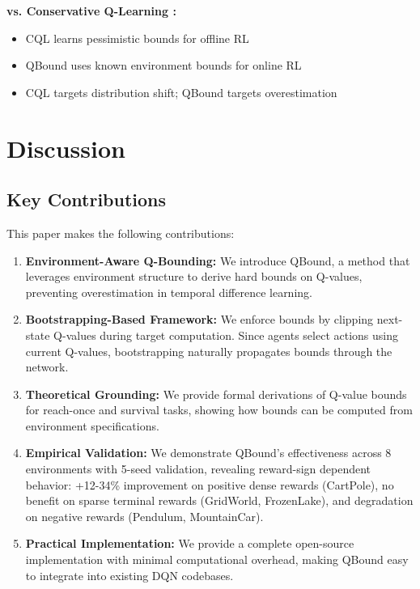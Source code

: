 \documentclass[11pt]{article}
\theoremstyle{definition}
\theoremstyle{remark}
\begin{document}
\textbf{vs. Conservative Q-Learning \citep{kumar2020conservative}:}
\begin{itemize}
    \item CQL learns pessimistic bounds for offline RL
    \item QBound uses known environment bounds for online RL
    \item CQL targets distribution shift; QBound targets overestimation
\end{itemize}

\section{Discussion}

\subsection{Key Contributions}

This paper makes the following contributions:

\begin{enumerate}
    \item \textbf{Environment-Aware Q-Bounding:} We introduce QBound, a method that leverages environment structure to derive hard bounds on Q-values, preventing overestimation in temporal difference learning.

    \item \textbf{Bootstrapping-Based Framework:} We enforce bounds by clipping next-state Q-values during target computation. Since agents select actions using current Q-values, bootstrapping naturally propagates bounds through the network.

    \item \textbf{Theoretical Grounding:} We provide formal derivations of Q-value bounds for reach-once and survival tasks, showing how bounds can be computed from environment specifications.

    \item \textbf{Empirical Validation:} We demonstrate QBound's effectiveness across 8 environments with 5-seed validation, revealing reward-sign dependent behavior: +12-34\% improvement on positive dense rewards (CartPole), no benefit on sparse terminal rewards (GridWorld, FrozenLake), and degradation on negative rewards (Pendulum, MountainCar).

    \item \textbf{Practical Implementation:} We provide a complete open-source implementation with minimal computational overhead, making QBound easy to integrate into existing DQN codebases.
\end{enumerate}
\end{document}
